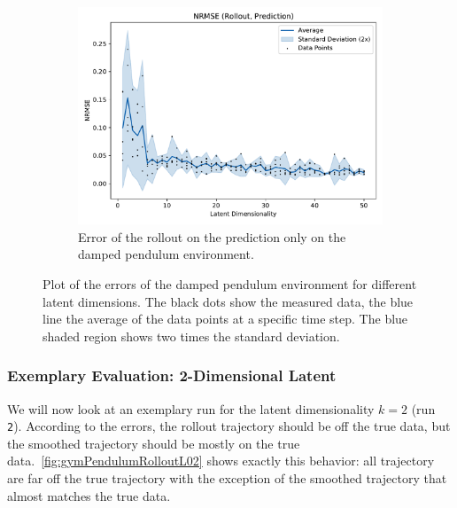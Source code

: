 \begin{figure}
\begin{subfigure}{0.5\linewidth}
					\label{fig:gymPendulumRmseTrain}
				\end{subfigure}%
				~
				\begin{subfigure}{0.5\linewidth}
					\centering
					\includegraphics[width=\linewidth]{figures/results/pendulum-damped/latent-dim/comparison-rmse-rollout-prediction-normalized-mean-vs-latent-dim.pdf}
					\caption{Error of the rollout on the prediction only on the damped pendulum environment.}
					\label{fig:gymPendulumRmsePred}
				\end{subfigure}
				\caption{Plot of the errors of the damped pendulum environment for different latent dimensions. The black dots show the measured data, the blue line the average of the data points at a specific time step. The blue shaded region shows two times the standard deviation.}
				\label{fig:gymPendulumRmse}
			\end{figure}

		\subsubsection{Exemplary Evaluation: 2-Dimensional Latent}
			We will now look at an exemplary run for the latent dimensionality \( k = 2 \) (run \texttt{2}). According to the errors, the rollout trajectory should be off the true data, but the smoothed trajectory should be mostly on the true data.~\autoref{fig:gymPendulumRolloutL02} shows exactly this behavior: all trajectory are far off the true trajectory with the exception of the smoothed trajectory that almost matches the true data.

